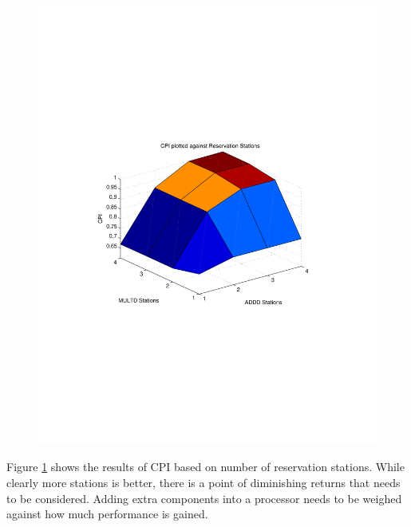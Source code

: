 \documentclass[twocolumn,letterpaper,10pt]{article}
\begin{document}
\begin{figure}[bht]
\includegraphics[scale=.5, clip=true, viewport=100 200 500 600]{CPI.pdf}
\caption{}
\label{fig:plot1}
\end{figure}


Figure \ref{fig:plot1} shows the results of CPI based on number of reservation stations. While clearly more stations is better, there is a point of diminishing returns that needs to be considered. Adding extra components into a processor needs to be weighed against how much performance is gained.
\end{document}
